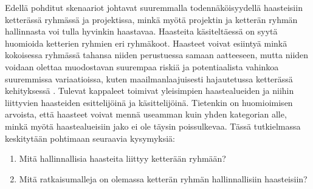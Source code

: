 Edellä pohditut skenaariot johtavat suuremmalla todennäköisyydellä haasteisiin ketterässä ryhmässä ja projektissa, minkä myötä projektin ja ketterän ryhmän hallinnasta voi tulla hyvinkin haastavaa. Haasteita käsiteltäessä on syytä huomioida ketterien ryhmien eri ryhmäkoot. Haasteet voivat esiintyä minkä kokoisessa ryhmässä tahansa niiden perustuessa samaan aatteeseen, mutta niiden voidaan olettaa muodostavan suurempaa riskiä ja potentiaalista vahinkoa suuremmissa variaatioissa, kuten maailmanlaajuisesti hajautetussa ketterässä kehityksessä \cite{ALZOUBI201622}. Tulevat kappaleet toimivat yleisimpien haastealueiden ja niihin liittyvien haasteiden esittelijöinä ja käsittelijöinä. Tietenkin on huomioimisen arvoista, että haasteet voivat mennä useamman kuin yhden kategorian alle, minkä myötä haastealueisiin jako ei ole täysin poissulkevaa. Tässä tutkielmassa keskitytään pohtimaan seuraavia kysymyksiä: \begin{enumerate}
    \item Mitä hallinnallisia haasteita liittyy ketterään ryhmään?
    \item Mitä ratkaisumalleja on olemassa ketterän ryhmän hallinnallisiin haasteisiin?
\end{enumerate}
